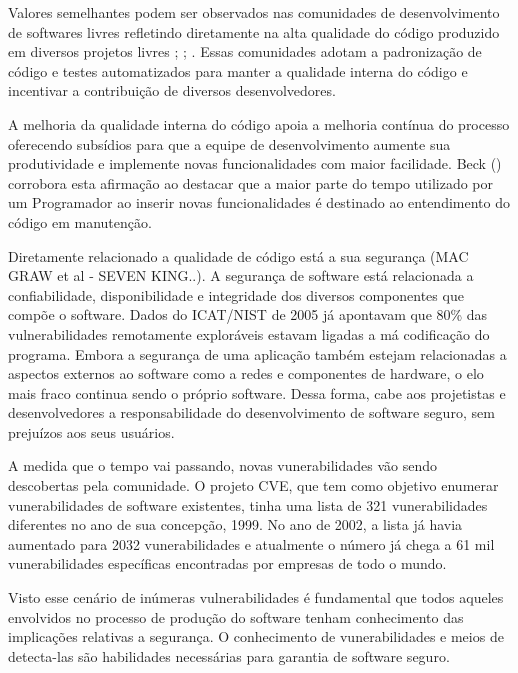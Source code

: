 %

Valores semelhantes podem ser observados nas comunidades de desenvolvimento de softwares livres refletindo diretamente na alta qualidade do código produzido em diversos projetos livres \cite{schmidt2001}; \cite{halloran2002}; \cite{michlmayr2003}. Essas comunidades adotam a padronização de código e testes automatizados para manter a qualidade interna do código e incentivar a contribuição de diversos desenvolvedores.

A melhoria da qualidade interna do código apoia a melhoria contínua do processo oferecendo subsídios para que a equipe de desenvolvimento aumente sua produtividade e implemente novas funcionalidades com maior facilidade. Beck (\citeyear{beck2007}) corrobora esta afirmação ao destacar que a maior parte do tempo utilizado por um Programador ao inserir novas funcionalidades é destinado ao entendimento do código em manutenção. 

Diretamente relacionado a qualidade de código está a sua segurança (MAC GRAW et al  - SEVEN KING..). A segurança de software está relacionada a confiabilidade, disponibilidade e integridade dos diversos componentes que compõe o software. Dados do ICAT/NIST de 2005 já apontavam que 80\% das vulnerabilidades remotamente exploráveis estavam ligadas a má codificação do programa. Embora a segurança de uma aplicação também estejam relacionadas a aspectos externos ao software como a redes e componentes de hardware, o elo mais fraco continua sendo o próprio software. Dessa forma, cabe aos projetistas e desenvolvedores a responsabilidade do desenvolvimento de software seguro, sem prejuízos aos seus usuários.

A medida que o tempo vai passando, novas vunerabilidades vão sendo descobertas pela comunidade. O projeto CVE, que tem como objetivo enumerar vunerabilidades de software existentes, tinha uma lista de 321 vunerabilidades diferentes no ano de sua concepção, 1999. No ano de 2002, a lista já havia aumentado para 2032 vunerabilidades e atualmente o número já chega a 61 mil vunerabilidades específicas encontradas por empresas de todo o mundo.

Visto esse cenário de inúmeras vulnerabilidades é fundamental que todos aqueles envolvidos no processo de produção do software tenham conhecimento das implicações relativas a segurança. O conhecimento de vunerabilidades e meios de detecta-las são habilidades necessárias para garantia de software seguro.

